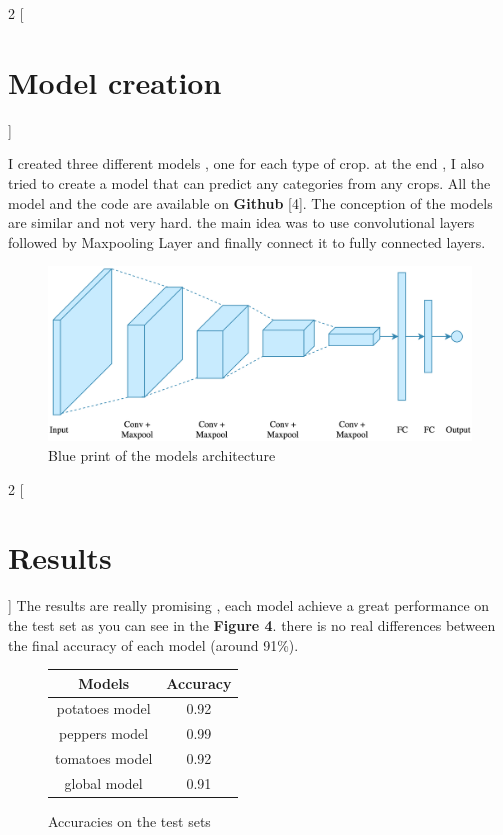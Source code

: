 \documentclass{article}
\begin{document}
\newpage
\begin{multicols}{2}
[
\section{Model creation}
]

I created three different models , one for each type of crop. at the end , I also tried to create a model that can predict any categories from any crops. All the model and the code are available on \textbf{Github} [4]. The conception of the models are similar and not very hard. the main idea was to use convolutional layers  followed by Maxpooling Layer and finally connect it to fully connected layers.

\end{multicols}

\begin{figure}[H]

\centerline{\includegraphics[scale = 0.25]{img/arch}}
\caption{Blue print of the models architecture }
\end{figure}

\begin{multicols}{2}
[
\section{Results}
]
The results are really promising , each model achieve a great performance on the test set as you can see in the \textbf{Figure 4}. there is no real differences between the final accuracy of each model (around 91\%).

\end{multicols}

\begin{figure}[H]
\centering
\begin{tabular}{|c|c|}
\hline
\textbf{Models}         & \textbf{Accuracy} \\ \hline
potatoes model & 0.92     \\ \hline
peppers model  & 0.99     \\ \hline
tomatoes model & 0.92     \\ \hline
global model   & 0.91     \\ \hline
\end{tabular}
\caption{Accuracies on the test sets}
\end{figure}
\end{document}
